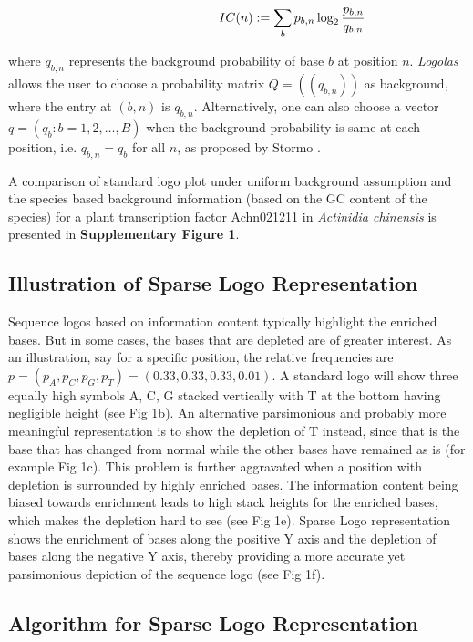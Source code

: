 \documentclass{bmcart}
\begin{document}
\begin{equation}\label{kl_def}
 \hspace{3 cm} IC (n) : = \sum_{b} p_{b,n} \log_{2} \frac{p_{b,n}}{q_{b,n}} 
\end{equation}

where $q_{b,n}$ represents the background probability of base $b$ at position $n$. 
\textit{Logolas} allows the user to choose a probability matrix $ Q = ((q_{b,n} )) $ as background, where the entry at $(b,n)$ is $q_{b,n}$. Alternatively, one can also choose a vector $q = \left ( q_{b} : b = 1,2,\ldots, B \right)$ when the background probability is same at each position, i.e. $q_{b,n} = q_{b}$ for all $n$, as proposed by Stormo \cite{Stormo2000}.

A comparison of standard logo plot under uniform background assumption and the species based background information (based on the GC content of the species) for a plant transcription factor  Achn021211 in \textit{Actinidia chinensis} is presented in \textbf{Supplementary Figure 1}. 

\subsection*{Illustration of Sparse Logo Representation}

Sequence logos based on information content typically highlight the enriched bases. But in some cases, the bases that are depleted are of greater interest. As an illustration, say for a specific position, the relative frequencies are $ p = (p_A, p_C, p_G, p_T) = (0.33, 0.33, 0.33, 0.01)$. A standard logo will show three equally high symbols A, C, G stacked vertically with T at the bottom having negligible height (see Fig 1b). An alternative parsimonious and probably more meaningful representation is to show the depletion of T instead, since that is the base that has changed from normal while the other bases have remained as is (for example Fig 1c). This problem is further aggravated when a position with depletion is surrounded by highly enriched bases. The information content being biased towards enrichment leads to high stack heights for the enriched bases, which makes the depletion hard to see (see Fig 1e). Sparse Logo representation shows the enrichment of bases along the positive Y axis and the depletion of bases along the negative Y axis, thereby providing a more accurate yet parsimonious depiction of the sequence logo (see Fig 1f).  

\subsection*{Algorithm for Sparse Logo Representation}
\end{document}
